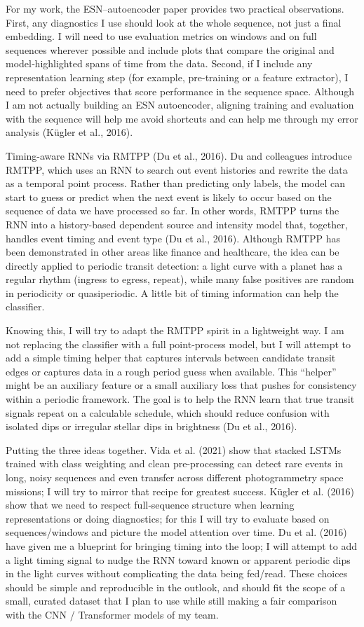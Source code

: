\documentclass[letterpaper]{article} %
\begin{document}
For my work, the ESN–autoencoder paper provides two practical observations. First, any diagnostics I use should look at the whole sequence, not just a final embedding. I will need to use evaluation metrics on windows and on full sequences wherever possible and include plots that compare the original and model‑highlighted spans of time from the data. Second, if I include any representation learning step (for example, pre-training or a feature extractor), I need to prefer objectives that score performance in the sequence space. Although I am not actually building an ESN autoencoder, aligning training and evaluation with the sequence will help me avoid shortcuts and can help me through my error analysis (Kügler et al., 2016).

Timing-aware RNNs via RMTPP (Du et al., 2016). Du and colleagues introduce RMTPP, which uses an RNN to search out event histories and rewrite the data as a temporal point process. Rather than predicting only labels, the model can start to guess or predict when the next event is likely to occur based on the sequence of data we have processed so far. In other words, RMTPP turns the RNN into a history-based dependent source and intensity model that, together, handles event timing and event type (Du et al., 2016). Although RMTPP has been demonstrated in other areas like finance and healthcare, the idea can be directly applied to periodic transit detection: a light curve with a planet has a regular rhythm (ingress to egress, repeat), while many false positives are random in periodicity or quasiperiodic. A little bit of timing information can help the classifier.

Knowing this, I will try to adapt the RMTPP spirit in a lightweight way. I am not replacing the classifier with a full point‑process model, but I will attempt to add a simple timing helper that captures intervals between candidate transit edges or captures data in a rough period guess when available. This “helper” might be an auxiliary feature or a small auxiliary loss that pushes for consistency within a periodic framework. The goal is to help the RNN learn that true transit signals repeat on a calculable schedule, which should reduce confusion with isolated dips or irregular stellar dips in brightness (Du et al., 2016).

Putting the three ideas together. Vida et al. (2021) show that stacked LSTMs trained with class weighting and clean pre-processing can detect rare events in long, noisy sequences and even transfer across different photogrammetry space missions; I will try to mirror that recipe for greatest success. Kügler et al. (2016) show that we need to respect full‑sequence structure when learning representations or doing diagnostics; for this I will try to evaluate based on sequences/windows and picture the model attention over time. Du et al. (2016) have given me a blueprint for bringing timing into the loop; I will attempt to add a light timing signal to nudge the RNN toward known or apparent periodic dips in the light curves without complicating the data being fed/read. These choices should be simple and reproducible in the outlook, and should fit the scope of a small, curated dataset that I plan to use while still making a fair comparison with the CNN / Transformer models of my team.
\end{document}
